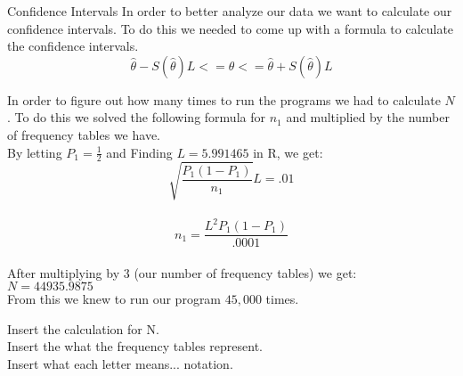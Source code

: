 \begin{frame}{Confidence Intervals}
In order to better analyze our data we want to calculate our confidence intervals. To do this we needed to come up with a formula to calculate the confidence intervals. \\
$$\hat{\theta} - S(\hat{\theta}) L <= \theta <= \hat{\theta} + S(\hat{\theta}) L$$

In order to figure out how many times to run the programs we had to calculate $N$. To do this we solved the following formula for $n_1$ and multiplied by the number of frequency tables we have.\\
By letting $P_1 = \frac{1}{2}$ and Finding $L = 5.991465$ in R, we get:\\

$$\sqrt{\frac{P_1 (1-P_1)}{n_1}} L = .01$$ \\
$$n_1 = \frac{L^2 P_1 (1-P_1)}{.0001}$$ \\
After multiplying by $3$ (our number of frequency tables) we get: \\
$N = 44935.9875$ \\
From this we knew to run our program $45,000$ times. 




Insert the calculation for N. \\
Insert the what the frequency tables represent.\\
Insert what each letter means... notation.\\ 
\end{frame}


